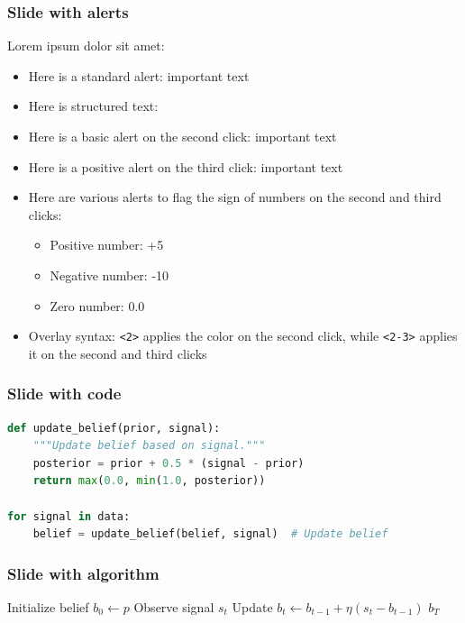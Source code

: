 \expandafter\documentclass\expandafter[\presentationclassoptions]{beamer}
\begin{document}
\begin{frame}
  \frametitle{Slide with alerts}
  \begin{singlespace}
    Lorem ipsum dolor sit amet:
    \begin{itemize}
      \item Here is a standard alert: \alert{important text}
      \item Here is structured text: 
      \item Here is a basic alert on the second click: \textcolor<2>{GitHubBlue}{important text}
      \item Here is a positive alert on the third click: \textcolor<3>{GitHubGreen}{important text}
      \item Here are various alerts to flag the sign of numbers on the second and third clicks:
        \begin{itemize}
          \item Positive number: \textcolor<2-3>{GitHubGreen}{+5}
          \item Negative number: \textcolor<2>{GitHubRed}{-10}
          \item Zero number: \textcolor<3>{GitHubBlue}{0.0}
        \end{itemize}
      \item Overlay syntax: \texttt{<2>} applies the color on the second click, while \texttt{<2-3>} applies it on the second and third clicks
    \end{itemize}
  \end{singlespace}
\end{frame}

\begin{frame}[fragile]
  \frametitle{Slide with code}
\begin{lstlisting}[language=Python]
def update_belief(prior, signal):
    """Update belief based on signal."""
    posterior = prior + 0.5 * (signal - prior)
    return max(0.0, min(1.0, posterior))

for signal in data:
    belief = update_belief(belief, signal)  # Update belief
\end{lstlisting}
\end{frame}

\begin{frame}
  \frametitle{Slide with algorithm}
  \begin{algorithm}[H]
    \caption{Iterated Update}
    \begin{algorithmic}[1]
      \State Initialize belief $b_0 \gets p$
      \State Observe signal $s_t$
      \State Update $b_t \gets b_{t-1} + \eta(s_t - b_{t-1})$
      \EndFor
      \State \Return $b_T$
    \end{algorithmic}
  \end{algorithm}
\end{frame}
\end{document}
